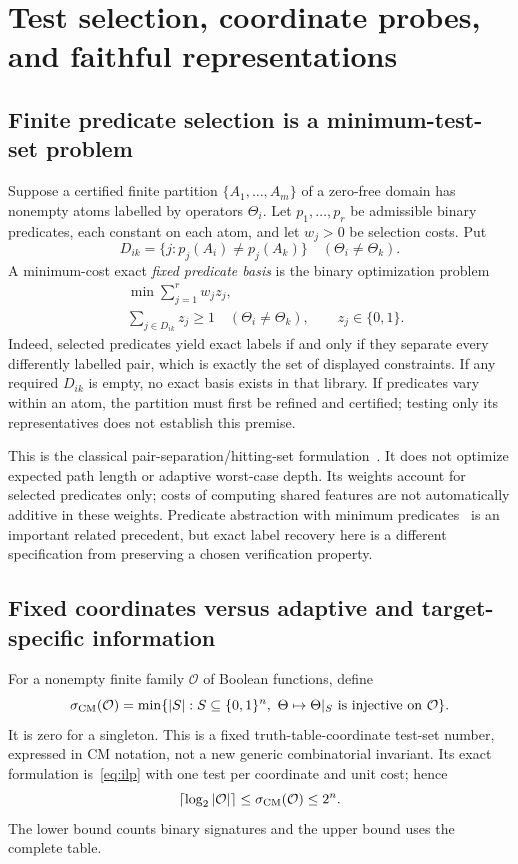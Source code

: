 \documentclass[11pt]{article}
\theoremstyle{definition}
\theoremstyle{remark}
\newcommand{\B}{\{0,1\}}
\newcommand{\Oo}{\mathcal O}
\begin{document}
\section{Test selection, coordinate probes, and faithful representations}\label{sec:tests}

\subsection{Finite predicate selection is a minimum-test-set problem}
Suppose a certified finite partition $\{A_1,\ldots,A_m\}$ of a zero-free domain has nonempty atoms labelled by operators $\Theta_i$. Let $p_1,\ldots,p_r$ be admissible binary predicates, each constant on each atom, and let $w_j>0$ be selection costs. Put
\[
 D_{ik}=\{j:p_j(A_i)\ne p_j(A_k)\}\quad(\Theta_i\ne\Theta_k).
\]
A minimum-cost exact \emph{fixed predicate basis} is the binary optimization problem
\begin{equation}\label{eq:ilp}
 \begin{aligned}
 &\min\sum_{j=1}^r w_jz_j,\\
 &\sum_{j\in D_{ik}}z_j\ge1\quad(\Theta_i\ne\Theta_k),\qquad z_j\in\B.
 \end{aligned}
\end{equation}
Indeed, selected predicates yield exact labels if and only if they separate every differently labelled pair, which is exactly the set of displayed constraints. If any required $D_{ik}$ is empty, no exact basis exists in that library. If predicates vary within an atom, the partition must first be refined and certified; testing only its representatives does not establish this premise.

This is the classical pair-separation/hitting-set formulation~\cite{Moret1985,Berman2005}. It does not optimize expected path length or adaptive worst-case depth. Its weights account for selected predicates only; costs of computing shared features are not automatically additive in these weights. Predicate abstraction with minimum predicates~\cite{Chaki2003} is an important related precedent, but exact label recovery here is a different specification from preserving a chosen verification property.

\subsection{Fixed coordinates versus adaptive and target-specific information}
For a nonempty finite family $\Oo$ of Boolean functions, define
\[
 \sigma_{\rm CM}(\Oo)
 =\min\{|S|:S\subseteq\B^n,\ \Theta\mapsto\Theta|_S\text{ is injective on }\Oo\}.
\]
It is zero for a singleton. This is a fixed truth-table-coordinate test-set number, expressed in CM notation, not a new generic combinatorial invariant. Its exact formulation is~\eqref{eq:ilp} with one test per coordinate and unit cost; hence
\[
 \lceil\log_2|\Oo|\rceil\le\sigma_{\rm CM}(\Oo)\le2^n.
\]
The lower bound counts binary signatures and the upper bound uses the complete table.
\end{document}
